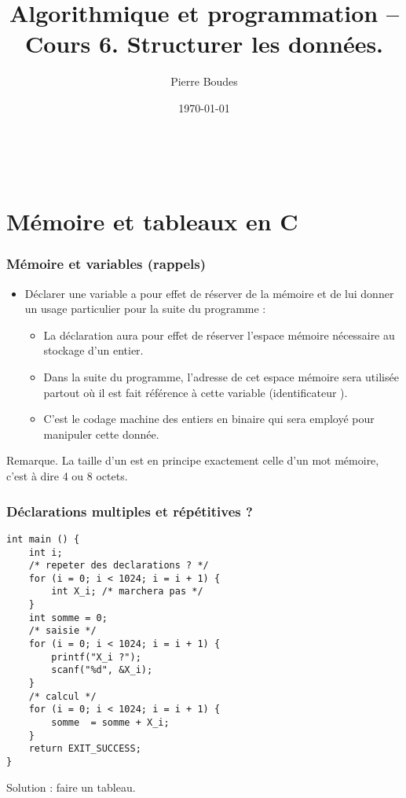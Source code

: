 \documentclass[xcolor=pdftex,svgnames,table]{beamer}
\title{ Algorithmique et programmation -- Cours 6. Structurer les données.}
\author{Pierre Boudes}
\date{\today}
\begin{document}
\begin{frame}
        \titlepage
        \vfill
        \begin{center}
                \\[2.5ex]
                {\tiny\CcNote{\CcLongnameByNcSa}}
                \vspace*{-2.5ex}
        \end{center}
\end{frame}

\section[Plan]{}
\frame[label=plan]{\tableofcontents}


\section{Mémoire et tableaux en C}
\begin{frame}
  \frametitle{Mémoire et variables (rappels)\nowrite}
  \begin{itemize}
  \item Déclarer une variable a pour effet de réserver de la mémoire
    et de lui donner un usage particulier pour la suite du
    programme :\pause
    \begin{itemize}
    \item La déclaration  aura pour effet de réserver l'espace mémoire nécessaire au stockage d'un entier.
\pause
\item  Dans la suite du programme, l'adresse de cet espace mémoire sera utilisée partout où il est fait référence à cette variable (identificateur ).
\pause
\item C'est le codage machine des entiers en binaire qui sera employé pour manipuler cette donnée. 
   \end{itemize}\pause
  \end{itemize}
  \begin{block}{Remarque.} 
    La  taille d'un  est en principe exactement celle d'un mot
    mémoire, c'est à dire 4 ou 8 octets. 
\end{block}
\end{frame} 

\begin{frame}[fragile]
  \frametitle{Déclarations multiples et répétitives ?}
  \begin{lstlisting}
int main () {
    int i;    
    /* repeter des declarations ? */
    for (i = 0; i < 1024; i = i + 1) {
        int X_i; /* marchera pas */
    }
    int somme = 0;
    /* saisie */
    for (i = 0; i < 1024; i = i + 1) {
        printf("X_i ?");
        scanf("%d", &X_i);
    }
    /* calcul */
    for (i = 0; i < 1024; i = i + 1) {
        somme  = somme + X_i;
    }
    return EXIT_SUCCESS;
}
  \end{lstlisting}
\pause
Solution : faire un tableau.
\end{frame}
\end{document}
